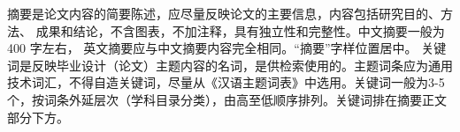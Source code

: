 \begin{cabstract}

\linespread{1.08}\selectfont

摘要是论文内容的简要陈述，应尽量反映论文的主要信息，内容包括研究目的、方法、
成果和结论，不含图表，不加注释，具有独立性和完整性。中文摘要一般为 400 字左右，
英文摘要应与中文摘要内容完全相同。“摘要”字样位置居中。 
关键词是反映毕业设计（论文）主题内容的名词，是供检索使用的。主题词条应为通用技术词汇，不得自造关键词，尽量从《汉语主题词表》中选用。关键词一般为3-5个，按词条外延层次（学科目录分类），由高至低顺序排列。关键词排在摘要正文部分下方。


\end{cabstract}
